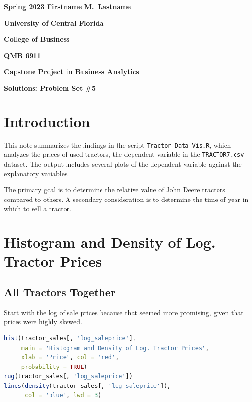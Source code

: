 \documentclass[11pt]{book}
\begin{document}

\pagestyle{empty}
{\noindent\bf Spring 2023 \hfill Firstname M.~Lastname}
\vskip 16pt
\centerline{\bf University of Central Florida}
\centerline{\bf College of Business}
\vskip 16pt
\centerline{\bf QMB 6911}
\centerline{\bf Capstone Project in Business Analytics}
\vskip 10pt
\centerline{\bf Solutions:  Problem Set \#5}
\vskip 32pt
\noindent

\section{Introduction}

This note summarizes the findings in the script
\texttt{Tractor\_Data\_Vis.R},
which analyzes the prices of used tractors,
the dependent variable in the \texttt{TRACTOR7.csv} dataset.
The output includes several plots of the
dependent variable against the explanatory variables.

The primary goal is to determine the relative value of John Deere tractors compared to others.
A secondary consideration is to determine the time of year in which to
sell a tractor.

\vfill
\pagebreak
\section{Histogram and Density of Log. Tractor Prices}


\subsection{All Tractors Together}

Start with the log of sale prices because that
seemed more promising, given that prices were highly skewed.

\begin{lstlisting}[language=R]
hist(tractor_sales[, 'log_saleprice'],
     main = 'Histogram and Density of Log. Tractor Prices',
     xlab = 'Price', col = 'red',
     probability = TRUE)
rug(tractor_sales[, 'log_saleprice'])
lines(density(tractor_sales[, 'log_saleprice']),
      col = 'blue', lwd = 3)
\end{lstlisting}
\end{document}

